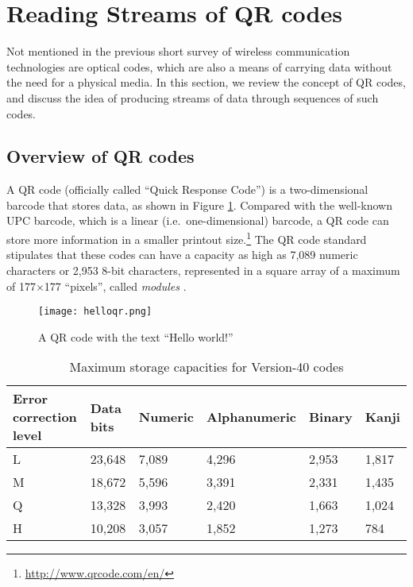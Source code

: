 
\section{Reading Streams of QR codes}\label{sec:qr:qrcode} %

Not mentioned in the previous short survey of wireless communication technologies are optical codes, which are also a means of carrying data without the need for a physical media. In this section, we review the concept of QR codes, and discuss the idea of producing streams of data through sequences of such codes.

\subsection{Overview of QR codes}

A QR code (officially called ``Quick Response Code'') \cite{qrcode-about} is a two-dimensional barcode that stores data, as shown in Figure \ref{fig:qr:helloqr}. Compared with the well-known UPC barcode, which is a linear (i.e.\ one-dimensional) barcode, a QR code can store more information in a smaller printout size.\footnote{\url{http://www.qrcode.com/en/}} The QR code standard stipulates that these codes can have a capacity as high as 7,089 numeric characters or 2,953 8-bit characters, represented in a square array of a maximum of 177$\times$177 ``pixels'', called \emph{modules} \cite{iso18004}. 

\begin{figure}
\centering
\texttt{[image: helloqr.png]}
\caption{A QR code with the text ``Hello world!''}
\label{fig:qr:helloqr}
\end{figure}

\begin{table}[t]
\begin{center}
\begin{tabular}{|l|l|l|l|l|l|}
\hline
\pbox[c][25pt][c]{\textwidth}{Error correction \\level} & Data bits & Numeric &	Alphanumeric & Binary & Kanji\\
\hline
L &	23,648 & 7,089 & 4,296 & 2,953 & 1,817\\
\hline
M & 18,672 & 5,596 & 3,391 & 2,331 & 1,435\\
\hline
Q & 13,328 & 3,993 & 2,420 & 1,663 & 1,024\\
\hline
H & 10,208 & 3,057 & 1,852 & 1,273 & 784\\
\hline
\end{tabular}
\caption[Capacities]{Maximum storage capacities for Version-40 codes}
\label{tab:qr:qrcode-capacity}
\end{center}
\end{table}

